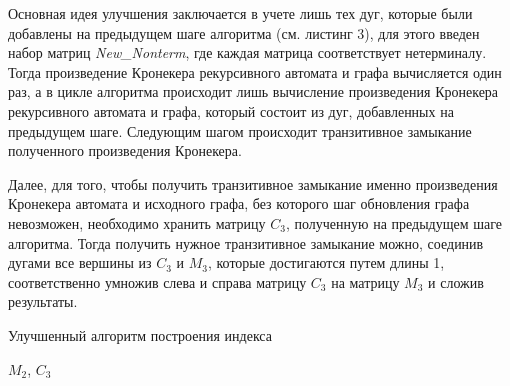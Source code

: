 Основная идея улучшения заключается в учете лишь тех дуг, которые были добавлены на предыдущем шаге алгоритма (см. листинг 3), для этого введен набор матриц \textit{New\_Nonterm}, где каждая матрица соответствует нетерминалу. Тогда произведение Кронекера рекурсивного автомата и графа вычисляется один раз, а в цикле алгоритма происходит лишь вычисление произведения Кронекера рекурсивного автомата и графа, который состоит из дуг, добавленных на предыдущем шаге. Следующим шагом происходит транзитивное замыкание полученного произведения Кронекера. 

Далее, для того, чтобы получить транзитивное замыкание именно произведения Кронекера автомата и исходного графа, без которого шаг обновления графа невозможен, необходимо хранить матрицу $C_3$, полученную на предыдущем шаге алгоритма. Тогда получить нужное транзитивное замыкание можно, соединив дугами все вершины из $C_3$ и $M_3$, которые достигаются путем длины 1, соответственно умножив слева и справа матрицу $C_3$ на матрицу $M_3$ и сложив результаты.

\begin{algorithm}[H]
\begin{algorithmic}[1]
\caption{Улучшенный алгоритм построения индекса}
\label{tensor:cfpq}
            \EndFor
        \EndFor
    \EndFor
    
                        \EndFor
                    \EndIf
                \EndIf
           \EndFor
        \EndFor
    \EndWhile
\State \Return $M_2$, $C_3$
\EndFunction
\end{algorithmic}
\end{algorithm}


